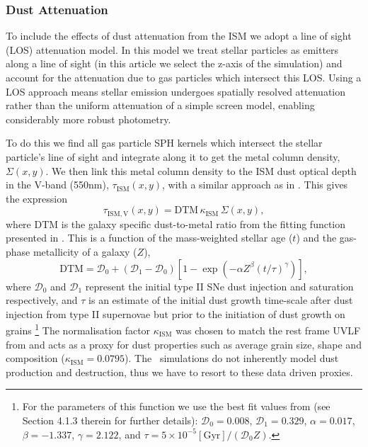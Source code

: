 \subsubsection{Dust Attenuation}
\label{sec:dustatt}

To include the effects of dust attenuation from the ISM we adopt a line of sight (LOS) attenuation model. In this model we treat stellar particles as emitters along a line of sight (in this article we select the z-axis of the simulation) and account for the attenuation due to gas particles which intersect this LOS. Using a LOS approach means stellar emission undergoes spatially resolved attenuation rather than the uniform attenuation of a simple screen model, enabling considerably more robust photometry. 

To do this we find all gas particle SPH kernels which intersect the stellar particle's line of sight and integrate along it to get the metal column density, $\Sigma(x,y)$. We then link this metal column density to the ISM dust optical depth in the V-band (550nm), $\tau_{\mathrm{ISM}}(x,y)$, with a similar approach as in \cite{Wilkins2017}. This gives the expression
\begin{equation}
    \tau_{\mathrm{ISM,V}}(x,y) = \mathrm{DTM} \, \kappa_{\mathrm{ISM}} \, \Sigma(x,y),
\end{equation}
where DTM is the galaxy specific dust-to-metal ratio from the fitting function presented in \cite{Vijayan2019}. This is a function of the mass-weighted stellar age ($t$) and the gas-phase metallicity of a galaxy ($Z$),
\begin{equation}
    \mathrm{DTM}=\mathcal{D}_{0} +(\mathcal{D}_{1} - \mathcal{D}_{0})\left[1-\exp\left(-\alpha Z^{\beta}(t/\tau)^{\gamma}\right)\right],
\end{equation}
where $\mathcal{D}_{0}$ and $\mathcal{D}_{1}$ represent the initial type II SNe dust injection and saturation respectively, and $\tau$ is an estimate of the initial dust growth time-scale after dust injection from type II supernovae but prior to the initiation of dust growth on grains
\footnote{For the parameters of this function we use the best fit values from \cite{Vijayan2019} (see Section 4.1.3 therein for further details): $\mathcal{D}_{0}=0.008$, $\mathcal{D}_{1}=0.329$, $\alpha=0.017$, $\beta=-1.337$, $\gamma=2.122$, and $\tau=5\times10^{-5}[\mathrm{Gyr}]/(\mathcal{D}_{0}Z)$.}
The normalisation factor $\kappa_{\mathrm{ISM}}$ was chosen to match the rest frame UVLF from \cite{Bouwens_2015a} and acts as a proxy for dust properties such as average grain size, shape and composition ($\kappa_{\mathrm{ISM}}=0.0795$). The \flares\ simulations do not inherently model dust production and destruction, thus we have to resort to these data driven proxies.  

